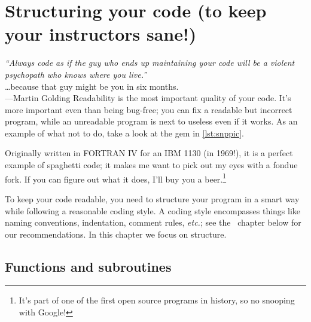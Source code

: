\documentclass[openany,oneside]{report}
\renewenvironment{quote}{\list{}{\leftmargin=8\parindent}\item\relax}{\endlist}
\begin{document}

\chapter[Structuring your code]{Structuring your code (to keep your instructors sane!)}
\label{chap:Structure}

\begin{quote}\small
  \emph{``Always code as if the guy who ends up maintaining your code will be a violent psychopath who knows where you live.''} \\ \ldots because that guy might be you in six months. \\ \hspace*{\fill}---Martin Golding
\end{quote}
Readability is the most important quality of your code.
It's more important even than being bug-free; you can fix a readable but incorrect program, while an unreadable program is next to useless even if it works.
As an example of what not to do, take a look at the gem in \autoref{lst:snppic}.

Originally written in FORTRAN IV for an IBM 1130 (in 1969!), it is a perfect example of spaghetti code; it makes me want to pick out my eyes with a fondue fork.
If you can figure out what it does, I'll buy you a beer.\footnote{It's part of one of the first open source programs in history, so no snooping with Google!}

To keep your code readable, you need to structure your program in a smart way while following a reasonable coding style.
A coding style encompasses things like naming conventions, indentation, comment rules, \emph{etc.}; see the ~chapter below for our recommendations.
In this chapter we focus on structure.

\section{Functions and subroutines}
\end{document}
